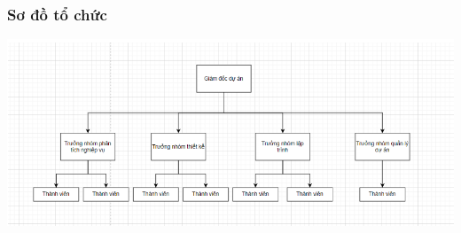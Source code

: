 \documentclass[12pt]{article}
\begin{document}
\subsubsection{Sơ đồ tổ chức}
\includegraphics[width=15cm]{II_6_4.png}
\vspace{0.5cm}
\end{document}
